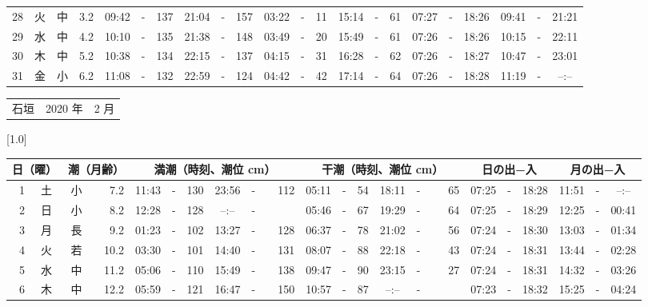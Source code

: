 \documentclass[12pt,a4j]{jsarticle}
\begin{document}
\begin{table}[htbp]
\begin{center}
{\begin{tabular}{|rc|cr|ccrccr|ccrccr|ccc|ccc|}
28 & 火 & 中 &  3.2 &  09:42 &-& 137 &  21:04 &-& 157 &  03:22 &-&  11 &  15:14 &-&  61 & 07:27 & -& 18:26 & 09:41 & -& 21:21 \\
29 & 水 & 中 &  4.2 &  10:10 &-& 135 &  21:38 &-& 148 &  03:49 &-&  20 &  15:49 &-&  61 & 07:26 & -& 18:26 & 10:15 & -& 22:11 \\
30 & 木 & 中 &  5.2 &  10:38 &-& 134 &  22:15 &-& 137 &  04:15 &-&  31 &  16:28 &-&  62 & 07:26 & -& 18:27 & 10:47 & -& 23:01 \\
31 & 金 & 小 &  6.2 &  11:08 &-& 132 &  22:59 &-& 124 &  04:42 &-&  42 &  17:14 &-&  64 & 07:26 & -& 18:28 & 11:19 & -& --:-- \\
   \hline
   \end{tabular}}
   \end{center}
\end{table}
\newpage
 \begin{table}[htbp]
 \begin{center}
 \begin{tabular}{lcc}
 \LARGE{石垣}  & \large{2020 年} & \large{ 2 月} \\
 \end{tabular}
 \end{center}
 \begin{center}
    \scalebox{0.7}[1.0]{
    \begin{tabular}{|rc|cr|ccrccr|ccrccr|ccc|ccc|}
    \hline
    \multicolumn{2}{|c|}{日（曜）} & \multicolumn{2}{c|}{潮（月齢）} & \multicolumn{6}{c|}{満潮（時刻、潮位 cm）} & \multicolumn{6}{c|}{干潮（時刻、潮位 cm）} & \multicolumn{3}{c|}{日の出−入} &  \multicolumn{3}{c|}{月の出−入}\\
 \hline
 1 & 土 & 小 &  7.2 &  11:43 &-& 130 &  23:56 &-& 112 &  05:11 &-&  54 &  18:11 &-&  65 & 07:25 & -& 18:28 & 11:51 & -& --:-- \\
 2 & 日 & 小 &  8.2 &  12:28 &-& 128 &  --:-- &-&~~~~~ &  05:46 &-&  67 &  19:29 &-&  64 & 07:25 & -& 18:29 & 12:25 & -& 00:41 \\
 3 & 月 & 長 &  9.2 &  01:23 &-& 102 &  13:27 &-& 128 &  06:37 &-&  78 &  21:02 &-&  56 & 07:24 & -& 18:30 & 13:03 & -& 01:34 \\
 4 & 火 & 若 & 10.2 &  03:30 &-& 101 &  14:40 &-& 131 &  08:07 &-&  88 &  22:18 &-&  43 & 07:24 & -& 18:31 & 13:44 & -& 02:28 \\
 5 & 水 & 中 & 11.2 &  05:06 &-& 110 &  15:49 &-& 138 &  09:47 &-&  90 &  23:15 &-&  27 & 07:24 & -& 18:31 & 14:32 & -& 03:26 \\
 6 & 木 & 中 & 12.2 &  05:59 &-& 121 &  16:47 &-& 150 &  10:57 &-&  87 &  --:-- &-&~~~~~ & 07:23 & -& 18:32 & 15:25 & -& 04:24 \\

\end{tabular}}
\end{center}
\end{table}
\end{document}
